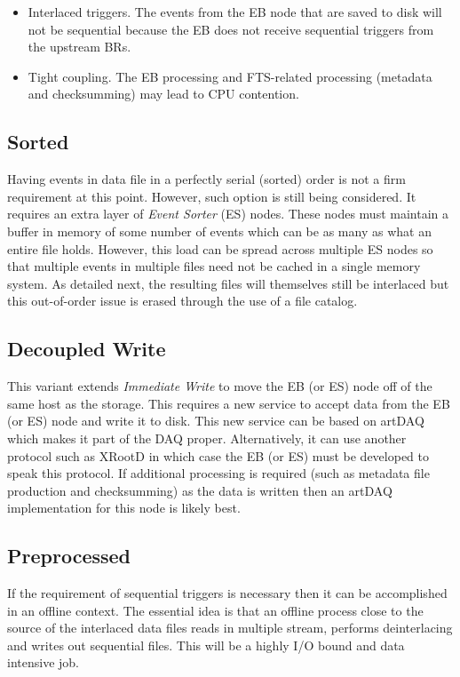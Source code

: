 \documentclass[pdftex,12pt,letter]{article}
\begin{document}
\begin{itemize}

\item Interlaced triggers.  The events from the EB node that are saved
  to disk will not be sequential because the EB does not receive
  sequential triggers from the upstream BRs.

\item Tight coupling.  The EB processing and FTS-related processing
  (metadata and checksumming) may lead to CPU contention.
\end{itemize}

\subsection{Sorted}

Having events in data file in a perfectly serial (sorted) order is not a firm requirement at this point.
However, such option is still being considered. It requires an extra layer of \textit{Event Sorter} (ES) nodes.  These nodes must maintain
a buffer in memory of some number of events which can be as many as
what an entire file holds.  However, this load can be spread across
multiple ES nodes so that multiple events in multiple files need not
be cached in a single memory system.  As detailed next, the resulting
files will themselves still be interlaced but this out-of-order issue
is erased through the use of a file catalog.

\subsection{Decoupled Write}

This variant extends \textit{Immediate Write} to move the EB (or ES)
node off of the same host as the storage.  This requires a new service
to accept data from the EB (or ES) node and write it to disk.  This
new service can be based on artDAQ which makes it part of the DAQ
proper.  Alternatively, it can use another protocol such as XRootD in
which case the EB (or ES) must be developed to speak this protocol.
If additional processing is required (such as metadata file production
and checksumming) as the data is written then an artDAQ implementation
for this node is likely best.

\subsection{Preprocessed}

If the requirement of sequential triggers is necessary then it can be
accomplished in an offline context.  The essential idea is that an
offline process close to the source of the interlaced data files reads
in multiple stream, performs deinterlacing and writes out sequential
files.  This will be a highly I/O bound and data intensive job.
\end{document}
